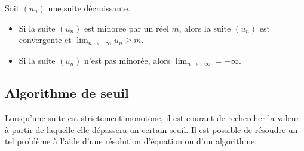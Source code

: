 \documentclass[11pt,fleqn, openany]{book} %
\begin{document}
\begin{theorem} Soit $(u_n)$ une suite décroissante.
\begin{itemize}
\item Si la suite $(u_n)$ est minorée par un réel $m$, alors la suite $(u_n)$ est convergente et $\displaystyle \lim_{n \to +\infty} u_n \geqslant m$.
\item Si la suite $(u_n)$ n'est pas minorée, alors $\displaystyle \lim_{n \to +\infty} = -\infty$.
\end{itemize} \end{theorem}


\subsection{Algorithme de seuil}

Lorsqu'une suite est strictement monotone, il est courant de rechercher la valeur à partir de laquelle elle dépassera un certain seuil. Il est possible de résoudre un tel problème à l'aide d'une résolution d'équation ou d'un algorithme.
\end{document}
